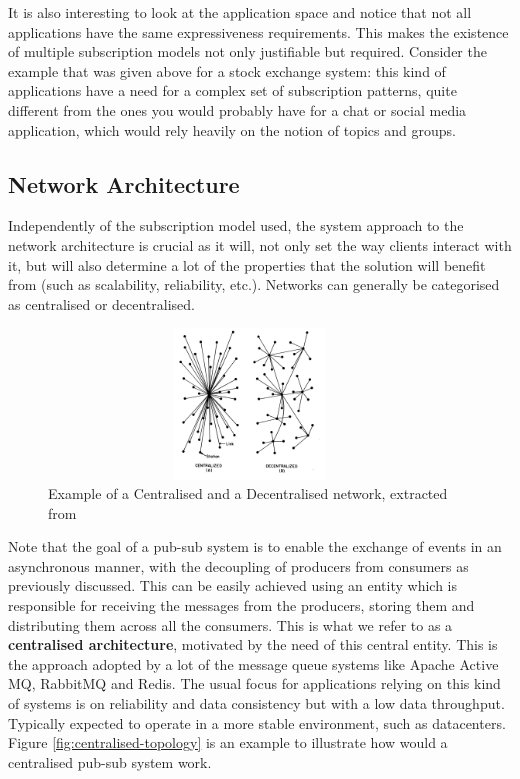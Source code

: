It is also interesting to look at the application space and notice that
not all applications have the same expressiveness requirements. This
makes the existence of multiple subscription models not only justifiable
but required. Consider the example that was given above for a stock exchange
system: this kind of applications have a need for a complex set of
subscription patterns, quite different from the ones you would probably
have for a chat or social media application, which would rely heavily on
the notion of topics and groups.

\subsection{Network Architecture}\label{network-architecture}

Independently of the subscription model used, the system approach to the
network architecture is crucial as it will, not only set the way clients
interact with it, but will also determine a lot of the properties that
the solution will benefit from (such as scalability, reliability, etc.). Networks
can generally be categorised as centralised or decentralised.

\begin{figure}[hb!]
  \centering
  \includegraphics[max height=4cm,max width=0.95\textwidth]{img/network-archs.png}
  \caption{Example of a Centralised and a Decentralised network, extracted from \cite{Baran1964}}
  \label{fig:network-archs}
\end{figure}

Note that the goal of a pub-sub system is to enable the exchange of
events in an asynchronous manner, with the decoupling of producers from
consumers as previously discussed. This can be easily achieved using an
entity which is responsible for receiving the messages from the
producers, storing them and distributing them across all the consumers. This is
what we refer to as a \textbf{centralised architecture}, motivated by the need of
this central entity. This is the approach adopted by a lot of the
message queue systems like Apache Active MQ, RabbitMQ and Redis. The
usual focus for applications relying on this kind of systems is on
reliability and data consistency but with a low data throughput. Typically expected
to operate in a more stable environment, such as datacenters. Figure \ref{fig:centralised-topology}
is an example to illustrate how would a centralised pub-sub system work.

